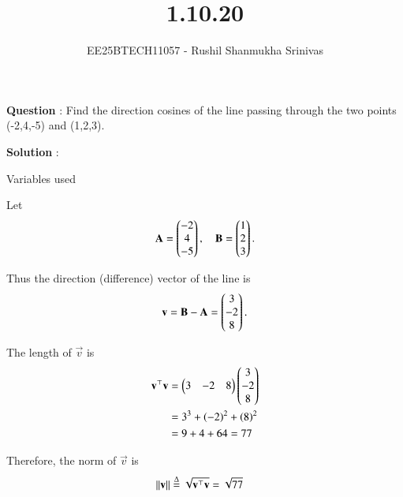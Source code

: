 \documentclass[journal]{IEEEtran}
\begin{document}




\title{1.10.20}
\author{EE25BTECH11057 - Rushil Shanmukha Srinivas
}
{\let\newpage\relax\maketitle}

\renewcommand{\thefigure}{\theenumi}
\renewcommand{\thetable}{\theenumi}
\setlength{\intextsep}{10pt} %

\renewcommand{\thetable}{\theenumi}

\textbf{Question} : Find the direction cosines of the line passing through the two points (-2,4,-5) and (1,2,3).

\textbf{Solution} : 

\begin{table}[h!]
\centering

\caption{Variables used}
\end{table}
Let
\begin{align}
\mathbf{A}=\begin{pmatrix}-2 \\ 4 \\ -5\end{pmatrix} ,\quad
\mathbf{B}=\begin{pmatrix}1 \\ 2 \\ 3\end{pmatrix} .
\end{align}


Thus the direction (difference) vector of the line is
\begin{align}
\mathbf{v}=\mathbf{B}-\mathbf{A} =\begin{pmatrix}3 \\ -2 \\ 8\end{pmatrix} .
\end{align}

The length of $\vec{v}$ is
\begin{align*}
\mathbf{v}^\top \mathbf{v} &= \begin{pmatrix}3 & -2 & 8\end{pmatrix}\begin{pmatrix}3 \\ -2 \\ 8\end{pmatrix} \\
&= 3^3 + \left(-2\right)^2 + \left(8\right)^2 \\
&= 9 + 4 + 64 = 77
\end{align*}

Therefore, the norm of $\vec{v}$ is
\begin{align*}
\left\lVert\mathbf{v}\right\rVert &\overset{\Delta}{=} \sqrt{\mathbf{v}^\top \mathbf{v}} = \sqrt{77} 
\end{align*} 
\end{document}
